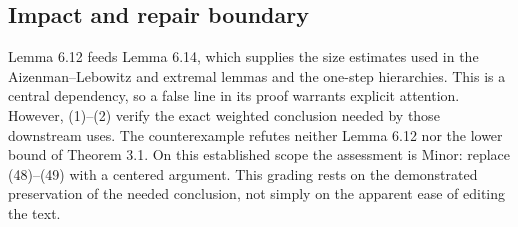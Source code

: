 \documentclass[10pt]{article}
\begin{document}
\subsection*{Impact and repair boundary}
Lemma 6.12 feeds Lemma 6.14, which supplies the size estimates used in the Aizenman–Lebowitz and extremal lemmas and the one-step hierarchies. This is a central dependency, so a false line in its proof warrants explicit attention. However, (1)–(2) verify the exact weighted conclusion needed by those downstream uses. The counterexample refutes neither Lemma 6.12 nor the lower bound of Theorem 3.1. On this established scope the assessment is Minor: replace (48)–(49) with a centered argument. This grading rests on the demonstrated preservation of the needed conclusion, not simply on the apparent ease of editing the text.\par
\end{document}
